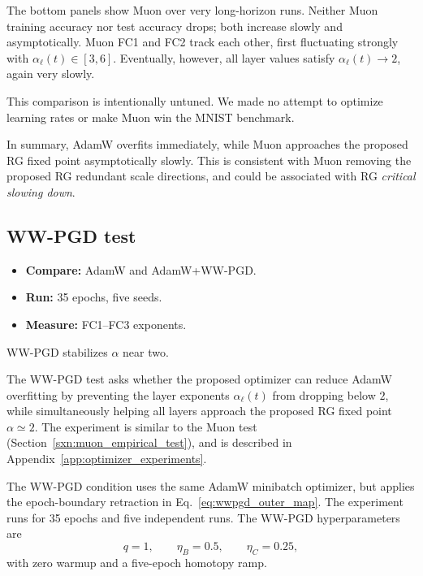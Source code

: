 \documentclass[10pt,twocolumn]{article}
\newcommand{\takeaway}[1]{%
  \par\vspace{4pt}\noindent\textcolor{boxblue}{#1}%
}
\begin{document}
The bottom panels show Muon over very long-horizon runs.
Neither Muon training accuracy nor test accuracy drops; both increase slowly and asymptotically.
Muon FC1 and FC2 track each other, first fluctuating strongly with $\alpha_\ell(t)\in[3,6]$.
Eventually, however, all layer values satisfy $\alpha_\ell(t)\rightarrow 2$, again very slowly.

This comparison is intentionally untuned. We made no attempt to optimize learning rates or make Muon win the MNIST benchmark.

In summary, AdamW overfits immediately, while Muon approaches the proposed RG fixed point
asymptotically slowly.  This is consistent with Muon removing the
proposed RG redundant scale directions, and could be associated with RG \emph{critical slowing down}.
\clearpage
\newpage
\subsection{WW-PGD test}
\label{sxn:wwpgd_empirical_test}

\begin{tcolorbox}[marginalbox,title=\textbf{15. WW-PGD test}]
\begin{itemize}
\item \textbf{Compare:} AdamW and AdamW+WW-PGD.
\item \textbf{Run:} 35 epochs, five seeds.
\item \textbf{Measure:} FC1--FC3 exponents.
\end{itemize}
\takeaway{WW-PGD stabilizes \(\alpha\) near two.}
\end{tcolorbox}

The WW-PGD test asks whether the proposed optimizer can reduce AdamW overfitting by preventing the layer exponents
$\alpha_\ell(t)$ from dropping below $2$, while simultaneously helping all layers approach the proposed RG fixed point
$\alpha\simeq 2$. The experiment is similar to the Muon test (Section~\ref{sxn:muon_empirical_test}), and is described in
Appendix~\ref{app:optimizer_experiments}.

The WW-PGD condition uses the same AdamW minibatch optimizer,
but applies the epoch-boundary retraction in Eq.~\eqref{eq:wwpgd_outer_map}.
The experiment runs for 35 epochs and five independent runs. The WW-PGD hyperparameters are
\begin{equation}
        q=1,
        \qquad
        \eta_B=0.5,
        \qquad
        \eta_C=0.25,
\end{equation}
with zero warmup and a five-epoch homotopy ramp.
\end{document}
